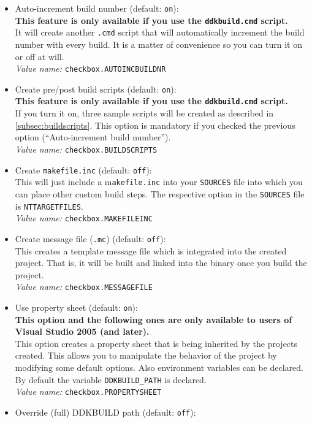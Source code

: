 \documentclass[a4paper,titlepage]{report}
\newcommand{\important}[1]{\textcolor[rgb]{0.90,0.00,0.00}{\textbf{#1}}}
\newcommand{\default}[1]{\textcolor[gray]{0.40}{(default: \texttt{#1})}}
\newcommand{\option}[1]{\textcolor[rgb]{0.00,0.20,0.20}{\textsf{#1}}}
\newcommand{\optiondeco}[1]{#1\vspace{0.1cm}}
\newcommand{\inioption}[1]{\\\textcolor[rgb]{0.00,0.00,0.40}{\textsl{Value name:} \texttt{#1}}}
\begin{document}
\begin{itemize}
  between \texttt{WCHAR*} and \texttt{UNICODE\_STRING}, for example).
  \inioption{checkbox.STRICTERCPP}
  \item \optiondeco{\option{Auto-increment build number} \default{on}:}\\
  \important{This feature is only available if you use the \texttt{ddkbuild.cmd} script.}\\
  It will create another \texttt{.cmd} script that will automatically
  increment the build number with every build. It is a matter of
  convenience so you can turn it on or off at will.
  \inioption{checkbox.AUTOINCBUILDNR}
  \item \optiondeco{\option{Create pre/post build scripts} \default{on}:}\\
  \important{This feature is only available if you use the \texttt{ddkbuild.cmd} script.}\\
  If you turn it on, three sample scripts will be created as described in
  \autoref{subsec:buildscripts}. This option is mandatory if you
  checked the previous option (``Auto-increment build number'').
  \inioption{checkbox.BUILDSCRIPTS}
  \item \optiondeco{\option{Create \texttt{makefile.inc}} \default{off}:}\\
  This will just include a m\texttt{akefile.inc} into your \texttt{SOURCES} file into which
  you can place other custom build steps. The respective option in the
  \texttt{SOURCES} file is \texttt{NTTARGETFILES}.
  \inioption{checkbox.MAKEFILEINC}
  \item \optiondeco{\option{Create message file (\texttt{.mc})} \default{off}:}\\
  This creates a template message file which is integrated into the
  created project. That is, it will be built and linked into the
  binary once you build the project.
  \inioption{checkbox.MESSAGEFILE}
  \item \optiondeco{\option{Use property sheet} \default{on}:}\\
  \important{This option and the following ones are only available to users of
  Visual Studio 2005 (and later).}\\
  This option creates a property sheet that is being inherited by the projects
  created. This allows you to manipulate the behavior of the project by
  modifying some default options. Also environment variables can be declared.
  By default the variable \texttt{DDKBUILD\_PATH} is declared.
  \inioption{checkbox.PROPERTYSHEET}
  \item \optiondeco{\option{Override (full) DDKBUILD path} \default{off}:}\\

\end{itemize}
\end{document}
